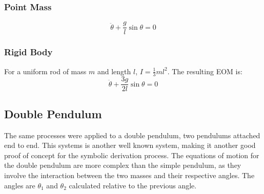 \documentclass[onecolumn,draftcls]{IEEEtran}
\begin{document}
\subsubsection*{Point Mass}
\begin{equation}
    \label{eq:pendulum_point_mass}
    \ddot{\theta} + \frac{g}{l} \sin\theta = 0
\end{equation}

\subsubsection*{Rigid Body}
For a uniform rod of mass $m$ and length $l$, $I = \frac{1}{3}ml^2$. The resulting EOM is:
\begin{equation}
    \label{eq:pendulum_rigid_body}
    \ddot{\theta} + \frac{3g}{2l} \sin\theta = 0
\end{equation}

\subsection{Double Pendulum}\label{app:double_pendulum}
The same processes were applied to a double pendulum, two pendulums attached end to end. This systems is another well known system, making it another good proof of concept for the symbolic derivation process. The equations of motion for the double pendulum are more complex than the simple pendulum, as they involve the interaction between the two masses and their respective angles. The angles are $\theta_1$ and $\theta_2$ calculated relative to the previous angle.
\end{document}
